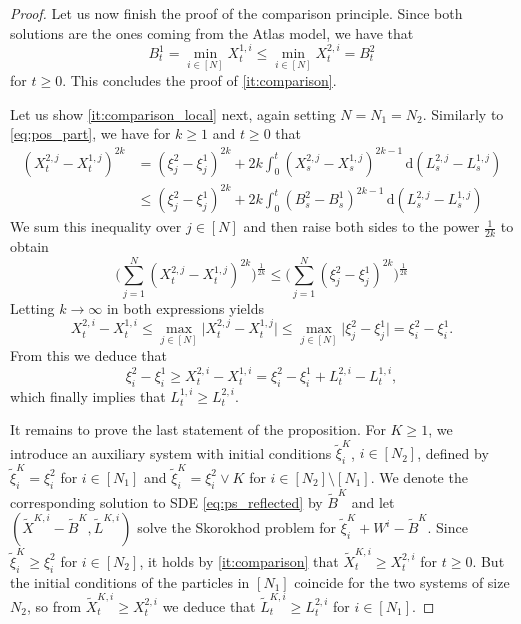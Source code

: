 \documentclass[10pt,a4paper]{amsart}
\renewcommand{\d}{\mathrm{d}}
\begin{document}
\begin{proof}
Let us now finish the proof of the comparison principle. Since both solutions are the ones coming from the Atlas model, we have that
\begin{equation*}
    B^1_t = \min_{i \in [N]} X^{1, i}_t \leq \min_{i \in [N]} X^{2, i}_t = B^2_t
\end{equation*}
for $t \geq 0$. This concludes the proof of \ref{it:comparison}.

Let us show \ref{it:comparison_local} next, again setting $N = N_1 = N_2$. Similarly to \eqref{eq:pos_part}, we have for $k 
\geq 1$ and $t \geq 0$ that
\begin{align*}
    (X^{2, j}_t - X^{1, j}_t)^{2k} &= (\xi^2_j - \xi^1_j)^{2k} + 2k \int_0^t (X^{2, j}_s - X^{1, j}_s)^{2k - 1} \, \d (L^{2, j}_s - L^{1, j}_s) \\
    &\leq (\xi^2_j - \xi^1_j)^{2k} + 2k \int_0^t (B^2_s - B^1_s)^{2k - 1} \, \d (L^{2, j}_s - L^{1, j}_s)
\end{align*}
We sum this inequality over $j \in [N]$ and then raise both sides to the power $\frac{1}{2k}$ to obtain
\begin{equation*}
    \biggl(\sum_{j = 1}^N (X^{2, j}_t - X^{1, j}_t)^{2k}\biggr)^{\frac{1}{2k}} \leq \biggl(\sum_{j = 1}^N (\xi^2_j - \xi^1_j)^{2k} \biggr)^{\frac{1}{2k}}
\end{equation*}
Letting $k \to \infty$ in both expressions yields
\begin{equation*}
    X^{2, i}_t - X^{1, i}_t \leq \max_{j \in [N]} \lvert X^{2, j}_t - X^{1, j}_t \rvert \leq \max_{j \in [N]} \vert \xi^2_j - \xi^1_j\rvert = \xi^2_i - \xi^1_i.
\end{equation*}
From this we deduce that
\begin{equation*}
    \xi^2_i - \xi^1_i \geq X^{2, i}_t - X^{1, i}_t = \xi^2_i - \xi^1_i + L^{2, i}_t - L^{1, i}_t,
\end{equation*}
which finally implies that $L^{1, i}_t \geq L^{2, i}_t$. 

It remains to prove the last statement of the proposition. For $K \geq 1$, we introduce an auxiliary system with initial conditions $\tilde{\xi}^K_i$, $i \in [N_2]$, defined by $\tilde{\xi}^K_i = \xi^2_i$ for $i \in [N_1]$ and $\tilde{\xi}^K_i = \xi^2_i \lor K$ for $i \in [N_2] \setminus [N_1]$. We denote the corresponding solution to SDE \eqref{eq:ps_reflected} by $\tilde{B}^K$ and let $(\tilde{X}^{K, i} - \tilde{B}^K, \tilde{L}^{K, i})$ solve the Skorokhod problem for $\tilde{\xi}^K_i + W^i - \tilde{B}^K$. Since $\tilde{\xi}^K_i \geq \xi^2_i$ for $i \in [N_2]$, it holds by \ref{it:comparison} that $\tilde{X}^{K, i}_t \geq X^{2, i}_t$ for $t \geq 0$. But the initial conditions of the particles in $[N_1]$ coincide for the two systems of size $N_2$, so from $\tilde{X}^{K, i}_t \geq X^{2, i}_t$ we deduce that $\tilde{L}^{K, i}_t \geq L^{2, i}_t$ for $i \in [N_1]$. 


\end{proof}
\end{document}
